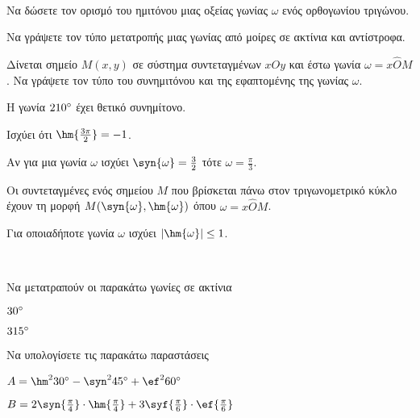 \documentclass[twoside,nofonts,ektypwsh]{frontisthrio-diag}
\begin{document}
\begin{thema}
\item\mbox{}\\\vspace{-7mm}
\begin{erwthma}
\item Να δώσετε τον ορισμό του ημιτόνου μιας οξείας γωνίας $ \omega $ ενός ορθογωνίου τριγώνου.
\item Να γράψετε τον τύπο μετατροπής μιας γωνίας από μοίρες σε ακτίνια και αντίστροφα.
\item Δίνεται σημείο $ M(x,y) $ σε σύστημα συντεταγμένων $ xOy $ και έστω γωνία $ \omega=x\hat{O}M $. Να γράψετε τον τύπο του συνημιτόνου και της εφαπτομένης της γωνίας $ \omega $.
\item \swstolathospan
\begin{alist}
\item Η γωνία $ 210\degree $ έχει θετικό συνημίτονο.
\item Ισχύει ότι $ \hm{\frac{3\pi}{2}}=-1 $.
\item Αν για μια γωνία $ \omega $ ισχύει $ \syn{\omega}=\frac{3}{2} $ τότε $ \omega=\frac{\pi}{3} $.
\item Οι συντεταγμένες ενός σημείου $ M $ που βρίσκεται πάνω στον τριγωνομετρικό κύκλο έχουν τη μορφή $ M(\syn{\omega},\hm{\omega}) $ όπου $ \omega=x\hat{O}M $.
\item Για οποιαδήποτε γωνία $ \omega $ ισχύει $ |\hm{\omega}|\leq 1 $.
\end{alist}
\end{erwthma}
\item\mbox{}\\\vspace{-7mm}
\begin{erwthma}
\item Να μετατραπούν οι παρακάτω γωνίες σε ακτίνια
\begin{multicols}{2}
\begin{alist}
\item $ 30\degree $
\item $ 315\degree $
\end{alist}
\end{multicols}
\item Να υπολογίσετε τις παρακάτω παραστάσεις
\begin{alist}
\item $ A=\hm^2{30\degree}-\syn^2{45\degree}+\ef^2{60\degree} $
\item $ B=2\syn{\frac{\pi}{4}}\cdot\hm{\frac{\pi}{4}}+3\syf{\frac{\pi}{6}}\cdot\ef{\frac{\pi}{6}} $

\end{alist}
\end{erwthma}
\end{thema}
\end{document}
